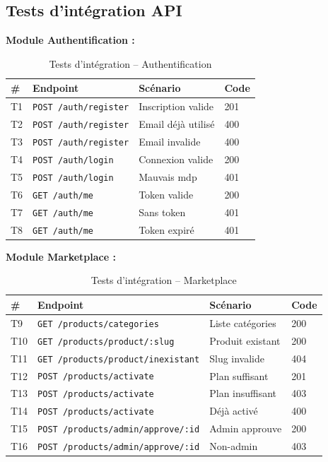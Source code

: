\subsection{Tests d'intégration API}

\textbf{Module Authentification :}

\begin{table}[H]
\centering
\caption{Tests d'intégration -- Authentification}
\label{tab:integration-auth}
\begin{tabular}{|l|l|l|l|}
\hline
\textbf{\#} & \textbf{Endpoint} & \textbf{Scénario} & \textbf{Code} \\
\hline
T1 & \texttt{POST /auth/register} & Inscription valide & 201 \\
\hline
T2 & \texttt{POST /auth/register} & Email déjà utilisé & 400 \\
\hline
T3 & \texttt{POST /auth/register} & Email invalide & 400 \\
\hline
T4 & \texttt{POST /auth/login} & Connexion valide & 200 \\
\hline
T5 & \texttt{POST /auth/login} & Mauvais mdp & 401 \\
\hline
T6 & \texttt{GET /auth/me} & Token valide & 200 \\
\hline
T7 & \texttt{GET /auth/me} & Sans token & 401 \\
\hline
T8 & \texttt{GET /auth/me} & Token expiré & 401 \\
\hline
\end{tabular}
\end{table}

\textbf{Module Marketplace :}

\begin{table}[H]
\centering
\caption{Tests d'intégration -- Marketplace}
\label{tab:integration-marketplace}
\begin{tabular}{|l|l|l|l|}
\hline
\textbf{\#} & \textbf{Endpoint} & \textbf{Scénario} & \textbf{Code} \\
\hline
T9 & \texttt{GET /products/categories} & Liste catégories & 200 \\
\hline
T10 & \texttt{GET /products/product/:slug} & Produit existant & 200 \\
\hline
T11 & \texttt{GET /products/product/inexistant} & Slug invalide & 404 \\
\hline
T12 & \texttt{POST /products/activate} & Plan suffisant & 201 \\
\hline
T13 & \texttt{POST /products/activate} & Plan insuffisant & 403 \\
\hline
T14 & \texttt{POST /products/activate} & Déjà activé & 400 \\
\hline
T15 & \texttt{POST /products/admin/approve/:id} & Admin approuve & 200 \\
\hline
T16 & \texttt{POST /products/admin/approve/:id} & Non-admin & 403 \\
\hline
\end{tabular}
\end{table}

